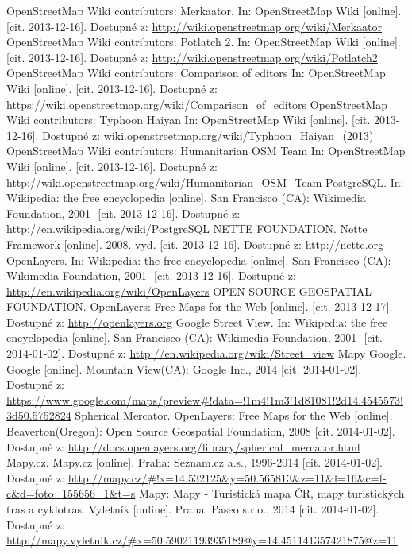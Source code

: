 \documentclass[11pt,a4paper,titlepage,oneside]{book}
\begin{document}
\begin{thebibliography}{50}
	OpenStreetMap Wiki contributors: Merkaator. In: OpenStreetMap Wiki [online]. [cit. 2013-12-16]. Dostupné z:  \url{http://wiki.openstreetmap.org/wiki/Merkaator}
	OpenStreetMap Wiki contributors: Potlatch 2. In: OpenStreetMap Wiki [online]. [cit. 2013-12-16]. Dostupné z:  \url{http://wiki.openstreetmap.org/wiki/Potlatch2}
	OpenStreetMap Wiki contributors: Comparison of editors In: OpenStreetMap Wiki [online]. [cit. 2013-12-16]. Dostupné z:	\url{https://wiki.openstreetmap.org/wiki/Comparison_of_editors}
	OpenStreetMap Wiki contributors: Typhoon Haiyan In: OpenStreetMap Wiki [online]. [cit. 2013-12-16]. Dostupné z: \url{wiki.openstreetmap.org/wiki/Typhoon_Haiyan_(2013)}
	OpenStreetMap Wiki contributors: Humanitarian OSM Team  In: OpenStreetMap Wiki [online]. [cit. 2013-12-16]. Dostupné z: \url{http://wiki.openstreetmap.org/wiki/Humanitarian_OSM_Team}
	PostgreSQL. In: Wikipedia: the free encyclopedia [online]. San Francisco (CA): Wikimedia Foundation, 2001- [cit. 2013-12-16]. Dostupné z: \url{http://en.wikipedia.org/wiki/PostgreSQL}
	NETTE FOUNDATION. Nette Framework [online]. 2008. vyd. [cit. 2013-12-16]. Dostupné z: \url{http://nette.org} 
	OpenLayers. In: Wikipedia: the free encyclopedia [online]. San Francisco (CA): Wikimedia Foundation, 2001- [cit. 2013-12-16]. Dostupné z: \url{http://en.wikipedia.org/wiki/OpenLayers}
	OPEN SOURCE GEOSPATIAL FOUNDATION. OpenLayers: Free Maps for the Web [online]. [cit. 2013-12-17]. Dostupné z: \url{http://openlayers.org} 
	 Google Street View. In: Wikipedia: the free encyclopedia [online]. San Francisco (CA): Wikimedia Foundation, 2001- [cit. 2014-01-02]. Dostupné z: \url{http://en.wikipedia.org/wiki/Street_view}
	Mapy Google. Google [online]. Mountain View(CA): Google Inc., 2014 [cit. 2014-01-02]. Dostupné z: \url{https://www.google.com/maps/preview#!data=!1m4!1m3!1d81081!2d14.4545573!3d50.5752824}
	Spherical Mercator. OpenLayers: Free Maps for the Web [online]. Beaverton(Oregon): Open Source Geospatial Foundation, 2008 [cit. 2014-01-02]. Dostupné z: \url{http://docs.openlayers.org/library/spherical_mercator.html}
	Mapy.cz. Mapy.cz [online]. Praha: Seznam.cz a.s., 1996-2014 [cit. 2014-01-02]. Dostupné z: \url{http://mapy.cz/#!x=14.532125&y=50.565813&z=11&l=16&c=f-c&d=foto_155656_1&t=s}
	Mapy: Mapy - Turistická mapa ČR, mapy turistických tras a cyklotras. Vyletník [online]. Praha: Paseo s.r.o., 2014 [cit. 2014-01-02]. Dostupné z: \url{http://mapy.vyletnik.cz/#x=50.59021193935189@y=14.451141357421875@z=11}

\end{thebibliography}
\end{document}

